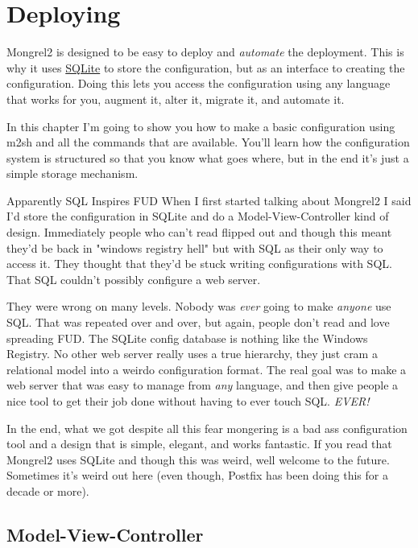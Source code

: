 \chapter{Deploying}

Mongrel2 is designed to be easy to deploy and \emph{automate} the deployment.
This is why it uses \href{http://www.sqlite.org/}{SQLite} to store the configuration,
but  as an interface to creating the configuration.  Doing this lets
you access the configuration using any language that works for you, augment it,
alter it, migrate it, and automate it.

In this chapter I'm going to show you how to make a basic configuration using
m2sh and all the commands that are available.  You'll learn how the configuration
system is structured so that you know what goes where, but in the end it's just
a simple storage mechanism.

\begin{aside}{Apparently SQL Inspires FUD}
When I first started talking about Mongrel2 I said I'd store the configuration
in SQLite and do a Model-View-Controller kind of design.  Immediately people who
can't read flipped out and though this meant they'd be back in "windows registry hell"
but with SQL as their only way to access it.  They thought that they'd be stuck writing
configurations with SQL.  That SQL couldn't possibly configure a web server.

They were wrong on many levels.  Nobody was \emph{ever} going to make \emph{anyone} use
SQL.  That was repeated over and over, but again, people don't read and love spreading
FUD.  The SQLite config database is nothing like the Windows Registry.  No other web
server really uses a true hierarchy, they just cram a relational model into a weirdo
configuration format.  The real goal was to make a web server that was easy to manage from
\emph{any} language, and then give people a nice tool to get their job done without
having to ever touch SQL.  \emph{EVER!}

In the end, what we got despite all this fear mongering is a bad ass configuration
tool and a design that is simple, elegant, and works fantastic.  If you read that
Mongrel2 uses SQLite and though this was weird, well welcome to the future.  Sometimes
it's weird out here (even though, Postfix has been doing this for a decade or more).
\end{aside}


\section{Model-View-Controller}


